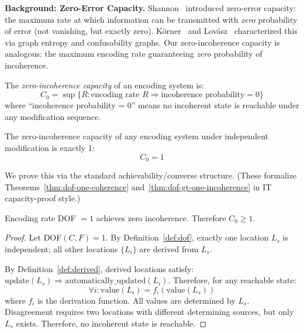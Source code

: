 \textbf{Background: Zero-Error Capacity.} Shannon~\cite{shannon1956zero} introduced zero-error capacity: the maximum rate at which information can be transmitted with \emph{zero} probability of error (not vanishing, but exactly zero). Körner~\cite{korner1973graphs} and Lovász~\cite{lovasz1979shannon} characterized this via graph entropy and confusability graphs. Our zero-incoherence capacity is analogous: the maximum encoding rate guaranteeing \emph{zero} probability of incoherence.

\begin{definition}\label{def:coherence-capacity}
The \emph{zero-incoherence capacity} of an encoding system is:
\[
C_0 = \sup\{R : \text{encoding rate } R \Rightarrow \text{incoherence probability} = 0\}
\]
where ``incoherence probability = 0'' means no incoherent state is reachable under any modification sequence.
\end{definition}

\begin{theorem}\label{thm:coherence-capacity}
The zero-incoherence capacity of any encoding system under independent modification is exactly 1:
\[
C_0 = 1
\]
\end{theorem}

We prove this via the standard achievability/converse structure. (These formalize Theorems~\ref{thm:dof-one-coherence} and~\ref{thm:dof-gt-one-incoherence} in IT capacity-proof style.)

\begin{theorem}[Achievability]\label{thm:capacity-achievability}
Encoding rate DOF $= 1$ achieves zero incoherence. Therefore $C_0 \geq 1$.
\end{theorem}

\begin{proof}
Let DOF$(C, F) = 1$. By Definition~\ref{def:dof}, exactly one location $L_s$ is independent; all other locations $\{L_i\}$ are derived from $L_s$.

By Definition~\ref{def:derived}, derived locations satisfy: $\text{update}(L_s) \Rightarrow \text{automatically\_updated}(L_i)$. Therefore, for any reachable state:
\[
\forall i: \text{value}(L_i) = f_i(\text{value}(L_s))
\]
where $f_i$ is the derivation function. All values are determined by $L_s$. Disagreement requires two locations with different determining sources, but only $L_s$ exists. Therefore, no incoherent state is reachable.
\end{proof}

